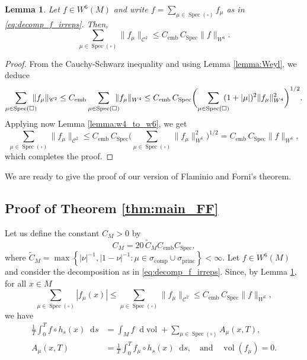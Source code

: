 \documentclass[JEP,XML,SOM,NoEqCountersInSection,Unicode,published]{cedram}
\newcommand*{\diff}{\mathop{}\!\mathrm{d}}
\DeclareMathOperator{\vol}{vol}
\DeclareMathOperator{\emb}{emb}
\DeclareMathOperator{\Spec}{Spec}
\DeclareMathOperator{\comp}{comp}
\DeclareMathOperator{\princ}{princ}
\newtheorem {lemma}[theorem]{Lemma}
\theoremstyle{definition}
\begin{document}
\begin{lemma}\label{lemma:bound_no_square}
Let $f \in W^6(M)$ and write $f= \sum_{\mu \in \Spec(\square)} f_\mu$ as in \eqref{eq:decomp_f_irreps}. Then,
\[
\sum_{\mu \in \Spec(\square)} \|f_\mu\|_{\mathscr{C}^2} \leq C_{\emb} \, C_{\Spec} \|f\|_{W^6}.
\]
\end{lemma}
\begin{proof}
From the Cauchy-Schwarz inequality and using Lemma \ref{lemma:Weyl}, we deduce
\begin{equation*}
\sum_{\mu \in \Spec(\square)}\hspace*{-2.5mm} \|f_\mu\|_{\mathscr{C}^2} \leq C_{\emb} \sum_{\mu \in \Spec(\square)}\hspace*{-2.5mm} \|f_\mu\|_{W^4} \leq C_{\emb} \, C_{\Spec} \biggl(\sum_{\mu \in \Spec(\square)}\hspace*{-2.5mm} (1+|\mu|)^2 \|f_\mu\|^2_{W^4}\biggr)^{1/2}.
\end{equation*}
Applying now Lemma \ref{lemma:w4_to_w6}, we get
\[
\sum_{\mu \in \Spec(\square)} \|f_\mu\|_{\mathscr{C}^2} \leq C_{\emb} \, C_{\Spec} \biggl(\sum_{\mu \in \Spec(\square)} \|f_\mu\|^2_{W^6} \biggr)^{1/2} = C_{\emb} \, C_{\Spec} \|f\|_{W^6},
\]
which completes the proof.
\end{proof}

We are ready to give the proof of our version of Flaminio and Forni's theorem.

\subsection{Proof of Theorem \ref{thm:main_FF}}

Let us define the constant $C_M>0$ by
\begin{equation}\label{eq:defin_CM}
C_M = 20 \, {\widetilde C_M} C_{\emb} C_{\Spec}, 
\end{equation}
where $\widetilde C_M= \max \left\{ |\nu|^{-1}, |1-\nu|^{-1} : \mu \in \sigma_{\comp} \cup \sigma_{\princ} \right\} < \infty$.
Let $f \in W^6(M)$ and consider the decomposition as in \eqref{eq:decomp_f_irreps}.
Since, by Lemma \ref{lemma:bound_no_square}, for all $x \in M$
\[
\sum_{\mu \in \Spec(\square)} |f_\mu(x)|\leq \sum_{\mu \in \Spec(\square)} \|f_\mu\|_{\mathscr{C}^2} \leq C_{\emb} \, C_{\Spec} \|f\|_{W^6},
\]
we have
\begin{align}\label{eq:int_A}
\frac{1}{T} \int_0^T f \circ h_s(x) \diff s &= \int_M f \diff \vol + \sum_{\mu \in \Spec(\square) } A_{\mu}(x,T), \\
\tag*{where} A_{\mu}(x,T) &= \frac{1}{T} \int_0^T f_\mu \circ h_s(x) \diff s, \quad\text{and}\quad \vol(f_\mu)=0.
\end{align}
\end{document}
